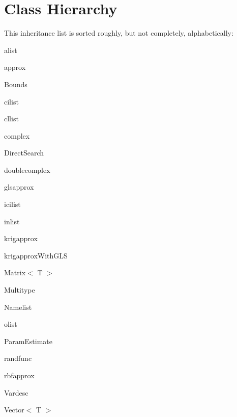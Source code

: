 \section{Class Hierarchy}
This inheritance list is sorted roughly, but not completely, alphabetically:\begin{CompactList}
\item alist\item approx\item Bounds\item cilist\item cllist\item complex\item Direct\-Search\item doublecomplex\item glsapprox\item icilist\item inlist\item {}
\item krigapprox\item krigapprox\-With\-GLS\item Matrix$<$ T $>$\item Multitype\item Namelist\item olist\item Param\-Estimate\item {}
\begin{CompactList}
\item {}
\end{CompactList}
\item randfunc\item rbfapprox\item Vardesc\item Vector$<$ T $>$\end{CompactList}

